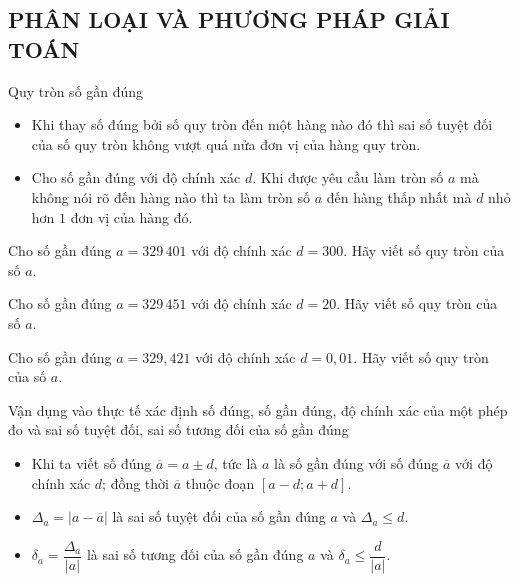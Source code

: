 \subsection{PHÂN LOẠI VÀ PHƯƠNG PHÁP GIẢI TOÁN}
\begin{dang}{Quy tròn số gần đúng}
	\begin{itemize}
		\item Khi thay số đúng bởi số quy tròn đến một hàng nào đó thì sai số tuyệt đối của số quy tròn không vượt quá nửa đơn vị của hàng quy tròn.
		\item Cho số gần đúng với độ chính xác $d$. Khi được yêu cầu làm tròn số $a$ mà không nói rõ đến hàng nào thì ta làm tròn số $a$ đến hàng thấp nhất mà $d$ nhỏ hơn $1$ đơn vị của hàng đó.
	\end{itemize}
\end{dang}
\begin{vd}
	Cho số gần đúng $a=329\,401$ với độ chính xác $d=300$. Hãy viết số quy tròn của số $a$.
\end{vd}
\begin{vd}
	Cho số gần đúng $a=329\,451$ với độ chính xác $d=20$. Hãy viết số quy tròn của số $a$.
\end{vd}
\begin{vd}
	Cho số gần đúng $a=329{,}421$ với độ chính xác $d=0{,}01$. Hãy viết số quy tròn của số $a$.
\end{vd}
\begin{dang}{Vận dụng vào thực tế xác định số đúng, số gần đúng, độ chính xác của một phép đo và sai số tuyệt đối, sai số tương đối của số gần đúng}
	\begin{itemize}
		\item Khi ta viết số đúng $\overline{a}=a\pm d$, tức là $a$ là số gần đúng với số đúng $\overline{a}$ với độ chính xác $d$; đồng thời $\overline{a}$ thuộc đoạn $[a-d;a+d]$.
		\item $\Delta_a=|a-\overline{a}|$ là sai số tuyệt đối của số gần đúng $a$ và $\Delta_a\leq d$.
		\item $\delta_a=\dfrac{\Delta_a}{|a|}$ là sai số tương đối của số gần đúng $a$ và $\delta_a \leq \dfrac{d}{|a|}$.
	\end{itemize}
\end{dang}
